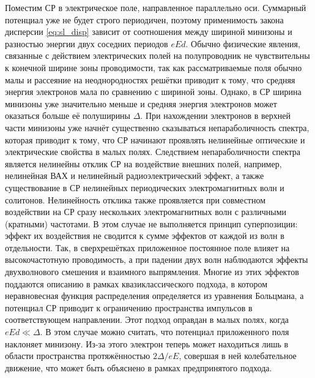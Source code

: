 Поместим СР в электрическое поле, направленное параллельно оси. Суммарный потенциал уже не будет строго периодичен, поэтому применимость закона дисперсии \eqref{eq:sl_disp} зависит от соотношения между шириной минизоны и разностью энергии двух соседних периодов \( eEd \). Обычно физические явления, связанные с действием электрических полей на полупроводник не чувствительны к конечной ширине зоны проводимости, так как рассматриваемые поля обычно малы и рассеяние на неоднородностях решётки приводит к тому, что средняя энергия электронов мала по сравнению с шириной зоны. Однако, в СР ширина минизоны уже значительно меньше и средняя энергия электронов может оказаться больше её полуширины \( \Delta \). При нахождении электронов в верхней части минизоны уже начнёт существенно сказываться непараболичность спектра, которая приводит к тому, что СР начинают проявлять нелинейные оптические и электрические свойства в малых полях. Следствием непараболичности спектра является нелинейны отклик СР на воздействие внешних полей, например, нелинейная ВАХ и нелинейный радиоэлектрический эффект, а также существование в СР нелинейных периодических электромагнитных волн и солитонов. Нелинейность отклика также проявляется при совместном воздействии на СР сразу нескольких электромагнитных волн с различными (кратными) частотами. В этом случае не выполняется принцип суперпозиции: эффект их воздействия не сводится к сумме эффектов от каждой из волн в отдельности. Так, в сверхрешётках приложенное постоянное поле влияет на высокочастотную проводимость, а при падении двух волн наблюдаются эффекты двухволнового смешения и взаимного выпрямления. Многие из этих эффектов поддаются описанию в рамках квазиклассического подхода, в котором неравновесная функция распределения определяется из уравнения Больцмана, а потенциал СР приводит к ограничению пространства импульсов в соответствующем направлении. Этот подход оправдан в малых полях, когда \( eEd \ll \Delta \). В этом случае можно считать, что потенциал приложенного поля наклоняет минизону. Из-за этого электрон теперь может находиться лишь в области пространства протяжённостью \( 2\Delta / eE \), совершая в ней колебательное движение, что может быть объяснено в рамках предпринятого подхода.

